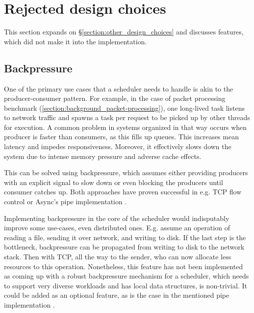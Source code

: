 \documentclass[12pt,a4paper,twoside]{report}
\begin{document}
\label{lastcontentpage} %





\appendix

\chapter{Rejected design choices}

This section expands on \S\ref{section:other_design_choices} and discusses features, which did not make it into the implementation. 


\section{Backpressure}
One of the primary use cases that a scheduler needs to handle is akin to the producer-consumer pattern. For example, in the case of packet processing benchmark (\ref{section:background_packet-processing}), one long-lived task listens to network traffic and spawns a task per request to be picked up by other threads for execution. A common problem in systems organized in that way occurs when producer is faster than consumers, as this fills up queues. This increases mean latency and impedes responsiveness. Moreover, it effectively slows down the system due to intense memory pressure and adverse cache effects.

This can be solved using backpressure, which assumes either providing producers with an explicit signal to slow down or even blocking the producers until consumer catches up. Both approaches have proven successful in e.g. TCP flow control \cite{rfc793} or Async's pipe implementation \cite{async_kernel}. 

Implementing backpressure in the core of the scheduler would indisputably improve some use-cases, even distributed ones. E.g. assume an operation of reading a file, sending it over network, and writing to disk. If the last step is the bottleneck, backpressure can be propagated from writing to disk to the network stack. Then with TCP, all the way to the sender, who can now allocate less resources to this operation. Nonetheless, this feature has not been implemented as coming up with a robust backpressure mechanism for a scheduler, which needs to support very diverse workloads and has local data structures, is non-trivial. It could be added as an optional feature, as is the case in the mentioned pipe implementation \cite{async_kernel}. 
\end{document}
